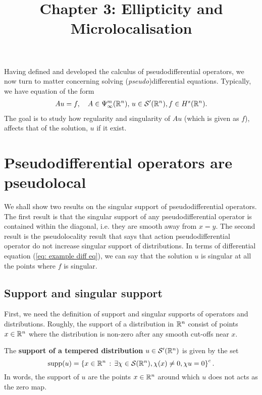 \documentclass[12pt]{article}
\title{Chapter 3: Ellipticity and Microlocalisation}
\date{}
\begin{document}
\maketitle

Having defined and developed the calculus of pseudodifferential operators, we now turn to matter concerning solving (\textit{pseudo})differential equations. Typically, we have equation of the form
\begin{align}
Au = f, \quad A \in \Psi^{m}_{\infty}({\mathbb R}^n), \, u \in \mathcal{S}'({\mathbb R}^n), f \in H^s({\mathbb R}^n). \label{eq: example diff eq}
\end{align}
The goal is to study how regularity and singularity of $Au$ (which is given as $f$), affects that of the solution, $u$ if it exist. 

\section{Pseudodifferential operators are pseudolocal}
We shall show two results on the singular support of pseudodifferential operators. The first result is that the singular support of any pseudodifferential operator  is contained within the diagonal, i.e. they are smooth away from $x = y$. The second result is the pseudolocality result that says that action pseudodifferential operator do not increase singular support of distributions. In terms of differential equation (\ref{eq: example diff eq}), we can say that the solution $u$ is singular at all the points where $f$ is singular. 

\subsection{Support and singular support} 
First, we need the definition of support and singular supports of operators and distributions. Roughly, the support of a distribution in ${\mathbb R}^n$ consist of points $x \in {\ensuremath {\mathbb R}}^n$ where the distribution is non-zero after any smooth cut-offs near $x$. 
\begin{fdefinition}
    The \textbf{support of a tempered distribution} $u \in \mathcal{S}'({\mathbb R}^n)$ is given by the set
    \[
    \mathrm{supp}(u) = \left\{x \in {\ensuremath {\mathbb R}}^n \, : \, \exists \chi \in \mathcal{S}({\mathbb R}^n), \chi(x) \neq 0, \chi u = 0\right\}^c. 
    \]
    In words, the support of $u$  are the points $x \in {\ensuremath {\mathbb R}}^n$ around which  $u$ does not acts as the zero map. 
\end{fdefinition}
\end{document}
